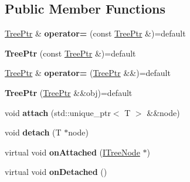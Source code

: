 \subsection*{Public Member Functions}
\begin{DoxyCompactItemize}
\item 
\hyperlink{classflw_1_1flf_1_1TreePtr}{Tree\+Ptr} \& {\bfseries operator=} (const \hyperlink{classflw_1_1flf_1_1TreePtr}{Tree\+Ptr} \&)=default\hypertarget{classflw_1_1flf_1_1TreePtr_a1391b85aded5a02b3eaf49276354f20d}{}\label{classflw_1_1flf_1_1TreePtr_a1391b85aded5a02b3eaf49276354f20d}

\item 
{\bfseries Tree\+Ptr} (const \hyperlink{classflw_1_1flf_1_1TreePtr}{Tree\+Ptr} \&)=default\hypertarget{classflw_1_1flf_1_1TreePtr_a342479c2abb2dd8861bc358db1728e20}{}\label{classflw_1_1flf_1_1TreePtr_a342479c2abb2dd8861bc358db1728e20}

\item 
\hyperlink{classflw_1_1flf_1_1TreePtr}{Tree\+Ptr} \& {\bfseries operator=} (\hyperlink{classflw_1_1flf_1_1TreePtr}{Tree\+Ptr} \&\&)=default\hypertarget{classflw_1_1flf_1_1TreePtr_a4d6bb09d0daf4784fbfc5892ccf229d8}{}\label{classflw_1_1flf_1_1TreePtr_a4d6bb09d0daf4784fbfc5892ccf229d8}

\item 
{\bfseries Tree\+Ptr} (\hyperlink{classflw_1_1flf_1_1TreePtr}{Tree\+Ptr} \&\&obj)=default\hypertarget{classflw_1_1flf_1_1TreePtr_ae490a01d5a3b41c8ff69b902f530429c}{}\label{classflw_1_1flf_1_1TreePtr_ae490a01d5a3b41c8ff69b902f530429c}

\item 
void {\bfseries attach} (std\+::unique\+\_\+ptr$<$ T $>$ \&\&node)\hypertarget{classflw_1_1flf_1_1TreePtr_afddb82f8fd20632610e951f55b2528bf}{}\label{classflw_1_1flf_1_1TreePtr_afddb82f8fd20632610e951f55b2528bf}

\item 
void {\bfseries detach} (T $\ast$node)\hypertarget{classflw_1_1flf_1_1TreePtr_aeb59cfe99394f4b3a98abeb5d2ad2021}{}\label{classflw_1_1flf_1_1TreePtr_aeb59cfe99394f4b3a98abeb5d2ad2021}

\item 
virtual void {\bfseries on\+Attached} (\hyperlink{classflw_1_1flf_1_1ITreeNode}{I\+Tree\+Node} $\ast$)\hypertarget{classflw_1_1flf_1_1TreePtr_a9f6fd4ca7f98953523a41741699e6697}{}\label{classflw_1_1flf_1_1TreePtr_a9f6fd4ca7f98953523a41741699e6697}

\item 
virtual void {\bfseries on\+Detached} ()\hypertarget{classflw_1_1flf_1_1TreePtr_a3b46ca5d542a91fe8f4b6287795e1f1c}{}\label{classflw_1_1flf_1_1TreePtr_a3b46ca5d542a91fe8f4b6287795e1f1c}


\end{DoxyCompactItemize}
